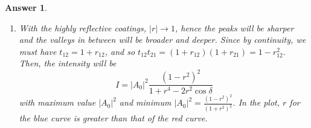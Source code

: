 \documentclass[a4paper]{article}
\newtheorem{ans}{Answer}[subsection]
\theoremstyle{new}
\begin{document}
\begin{ans}
\begin{enumerate}[label=(\roman*)]
\item With the highly reflective coatings, $|r|\rightarrow 1$, hence the peaks will be sharper and the valleys in between will be broader and deeper. Since by continuity, we must have $t_{12}=1+r_{12}$, and so $t_{12}t_{21}=(1+r_{12})(1+r_{21})=1-r_{12}^2$. Then, the intensity will be
$$I=|A_0|^2\frac{(1-r^2)^2}{1+r^4-2r^2\cos\delta}$$
with maximum value $|A_0|^2$ and minimum $|A_0|^2=\frac{(1-r^2)^2}{(1+r^2)^2}$. In the plot, $r$ for the blue curve is greater than that of the red curve.
\begin{center}
\end{center}
\end{enumerate}
\end{ans}
\newpage
\end{document}
